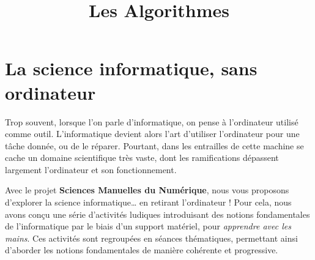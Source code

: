 \documentclass[a5paper,pagesize,DIV=14]{scrbook}
\title{Les Algorithmes}
\date{}
\begin{document}
\maketitle

\chapter*{La science informatique, sans ordinateur}


Trop souvent, lorsque l'on parle d'informatique, on pense à l'ordinateur utilisé comme outil. L'informatique devient alors l'art d'utiliser l'ordinateur pour une tâche donnée, ou de le réparer. Pourtant, dans les entrailles de cette machine se cache un domaine scientifique très vaste, dont les ramifications dépassent largement l'ordinateur et son fonctionnement.

Avec le projet \textbf{Sciences Manuelles du Numérique}, nous vous proposons d'explorer
la science informatique{\ldots} en retirant l'ordinateur ! Pour cela, nous avons conçu une série d'activités ludiques introduisant des notions fondamentales de l'informatique par le biais d'un support matériel, pour \textit{apprendre avec les mains}. Ces activités sont regroupées en séances thématiques, permettant ainsi d'aborder les notions fondamentales de manière cohérente et progressive.
\end{document}
